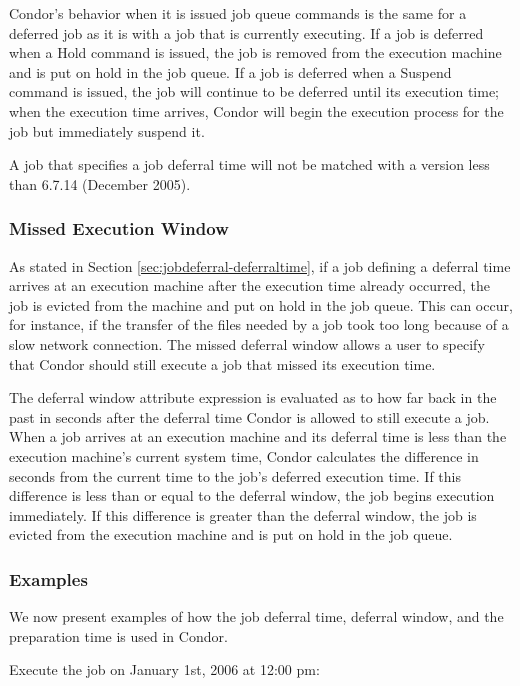 Condor's behavior when it is issued job queue commands is the same for a deferred job as it is with a job that is currently executing. If a job is deferred when a Hold command is issued, the job is removed from the execution machine and is put on hold in the job queue. If a job is deferred when a Suspend command is issued, the job will continue to be deferred until its execution time; when the execution time arrives, Condor will begin the execution process for the job but immediately suspend it.

A job that specifies a job deferral time will not be matched with a  version less than 6.7.14 (December 2005).

\subsubsection{Missed Execution Window}
\label{sec:jobdeferral-deferralwindow}
As stated in Section \ref{sec:jobdeferral-deferraltime}, if a job defining a deferral time arrives at an execution machine after the execution time already occurred, the job is evicted from the machine and put on hold in the job queue. This can occur, for instance, if the transfer of the files needed by a job took too long because of a slow network connection. The missed deferral window allows a user to specify that Condor should still execute a job that missed its execution time.

The deferral window attribute expression is evaluated as to how far back in the past in seconds after the deferral time Condor is allowed to still execute a job. When a job arrives at an execution machine and its deferral time is less than the execution machine's current system time, Condor calculates the difference in seconds from the current time to the job's deferred execution time. If this difference is less than or equal to the deferral window, the job begins execution immediately. If this difference is greater than the deferral window, the job is evicted from the execution machine and is put on hold in the job queue.

\subsubsection{Examples}
\label{sec:jobdeferral-examples}
We now present examples of how the job deferral time, deferral window, and the preparation time is used in Condor.

Execute the job on January 1st, 2006 at 12:00 pm:

